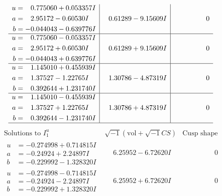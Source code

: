 \documentclass[1p]{elsarticle_modified}
\theoremstyle{definition}
\newcommand{\I}{\sqrt{-1}}
\begin{document}
$$\begin{array}{c|c|c}
\begin{aligned}
u &= \phantom{-}0.775060 + 0.053357 I \\
a &= \phantom{-}2.95172 - 0.60530 I \\
b &= -0.044043 - 0.639776 I\end{aligned}
 & \phantom{-}0.61289 - 9.15609 I & \phantom{-0.000000 } 0 \\ \hline\begin{aligned}
u &= \phantom{-}0.775060 - 0.053357 I \\
a &= \phantom{-}2.95172 + 0.60530 I \\
b &= -0.044043 + 0.639776 I\end{aligned}
 & \phantom{-}0.61289 + 9.15609 I & \phantom{-0.000000 } 0 \\ \hline\begin{aligned}
u &= \phantom{-}1.145010 + 0.455939 I \\
a &= \phantom{-}1.37527 - 1.22765 I \\
b &= \phantom{-}0.392644 + 1.231740 I\end{aligned}
 & \phantom{-}1.30786 - 4.87319 I & \phantom{-0.000000 } 0 \\ \hline\begin{aligned}
u &= \phantom{-}1.145010 - 0.455939 I \\
a &= \phantom{-}1.37527 + 1.22765 I \\
b &= \phantom{-}0.392644 - 1.231740 I\end{aligned}
 & \phantom{-}1.30786 + 4.87319 I & \phantom{-0.000000 } 0\\
 \hline 
 \end{array}$$\newpage$$\begin{array}{c|c|c}  
\text{Solutions to }I^u_{1}& \I (\text{vol} + \sqrt{-1}CS) & \text{Cusp shape}\\
 \hline 
\begin{aligned}
u &= -0.274998 + 0.714815 I \\
a &= -0.24924 + 2.24897 I \\
b &= -0.229992 - 1.328320 I\end{aligned}
 & \phantom{-}6.25952 - 6.72620 I & \phantom{-0.000000 } 0 \\ \hline\begin{aligned}
u &= -0.274998 - 0.714815 I \\
a &= -0.24924 - 2.24897 I \\
b &= -0.229992 + 1.328320 I\end{aligned}
 & \phantom{-}6.25952 + 6.72620 I & \phantom{-0.000000 } 0 \\ \hline\begin{aligned}

\end{aligned}
\end{array}$$
\end{document}
